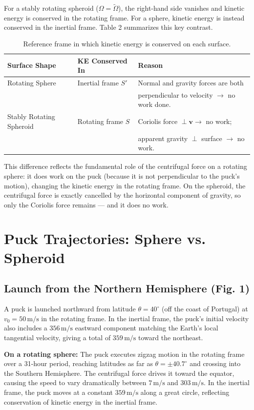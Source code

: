 \documentclass[10pt, a4paper]{article}
\begin{document}
For a stably rotating spheroid ($\Omega = \tilde{\Omega}$), the right-hand side vanishes and kinetic energy is conserved in the rotating frame. For a sphere, kinetic energy is instead conserved in the inertial frame. Table 2 summarizes this key contrast. 

\begin{table}[h]
\centering
\begin{tabular}{lll}
\toprule
\textbf{Surface Shape} & \textbf{KE Conserved In} & \textbf{Reason} \\
\midrule
Rotating Sphere & Inertial frame $S'$ & Normal and gravity forces are both \\
& & perpendicular to velocity $\rightarrow$ no work done. \\
Stably Rotating Spheroid & Rotating frame $S$ & Coriolis force $\perp \mathbf{v} \rightarrow$ no work; \\
& & apparent gravity $\perp$ surface $\rightarrow$ no work. \\
\bottomrule
\end{tabular}
\caption{Reference frame in which kinetic energy is conserved on each surface.}
\label{tab:ke}
\end{table}

This difference reflects the fundamental role of the centrifugal force on a rotating sphere: it does work on the puck (because it is not perpendicular to the puck’s motion), changing the kinetic energy in the rotating frame. On the spheroid, the centrifugal force is exactly cancelled by the horizontal component of gravity, so only the Coriolis force remains — and it does no work. 

\section{Puck Trajectories: Sphere vs. Spheroid}
\subsection{Launch from the Northern Hemisphere (Fig. 1)}
A puck is launched northward from latitude $\theta = 40^{\circ}$ (off the coast of Portugal) at $v_0 = 50\,\text{m/s}$ in the rotating frame. In the inertial frame, the puck’s initial velocity also includes a $356\,\text{m/s}$ eastward component matching the Earth’s local tangential velocity, giving a total of $359\,\text{m/s}$ toward the northeast. 

\textbf{On a rotating sphere: }The puck executes zigzag motion in the rotating frame over a 31-hour period, reaching latitudes as far as $\theta = \pm 40.7^{\circ}$ and crossing into the Southern Hemisphere. The centrifugal force drives it toward the equator, causing the speed to vary dramatically between $7\,\text{m/s}$ and $303\,\text{m/s}$. In the inertial frame, the puck moves at a constant $359\,\text{m/s}$ along a great circle, reflecting conservation of kinetic energy in the inertial frame. 
\end{document}

